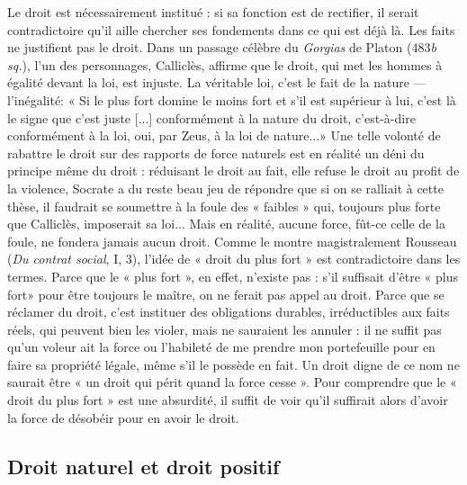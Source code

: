 Le droit est nécessairement institué : si
sa fonction est de rectifier, il serait
contradictoire qu'il aille chercher ses
fondements dans ce qui est déjà là. Les
faits ne justifient pas le droit. Dans un
passage célèbre du {\it Gorgias} de Platon
(483{\it b sq.}), l'un des personnages, Calliclès, affirme que le droit, qui met les
hommes à égalité devant la loi, est
injuste. La véritable loi, c’est le fait de la
nature — l'inégalité: « Si le plus fort
domine le moins fort et s'il est supérieur
à lui, c'est là le signe que c’est juste [...]
conformément à la nature du droit, c'est-à-dire conformément à la loi, oui, par
Zeus, à la loi de nature...» Une telle
volonté de rabattre le droit sur des rapports
%
 de force naturels est en réalité un
déni du principe même du droit : réduisant le droit au fait, elle refuse le droit
au profit de la violence, Socrate a du
reste beau jeu de répondre que si on se
ralliait à cette thèse, il faudrait se soumettre à la foule des « faibles » qui,
 toujours plus forte que Calliclès, imposerait
sa loi... Mais en réalité, aucune force,
fût-ce celle de la foule, ne fondera
jamais aucun droit. Comme le montre
magistralement Rousseau ({\it Du contrat social}, I, 3), l'idée de « droit du plus fort »
est contradictoire dans les termes. Parce
que le « plus fort », en effet, n'existe pas :
s'il suffisait d’être « plus fort» pour être
toujours le maître, on ne ferait pas appel
au droit. Parce que se réclamer du droit,
c'est instituer des obligations durables,
irréductibles aux faits réels, qui peuvent
bien les violer, mais ne sauraient les
annuler : il ne suffit pas qu'un voleur ait
la force ou l’habileté de me prendre
mon portefeuille pour en faire sa propriété légale, même s’il le possède en
fait. Un droit digne de ce nom ne saurait
être « un droit qui périt quand la force
cesse ». Pour comprendre que le « droit
du plus fort » est une absurdité, il suffit
de voir qu'il suffirait alors d’avoir la
force de désobéir pour en avoir le
droit.

\subsection{Droit naturel et droit positif}

